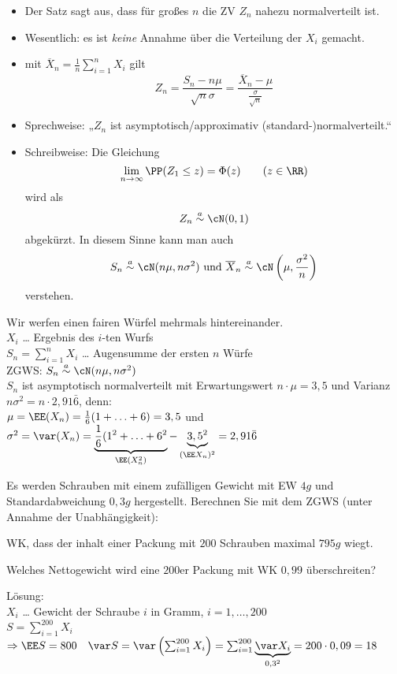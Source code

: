 \begin{itemize}
\item Der Satz sagt aus, dass für großes $n$ die ZV $Z_n$ nahezu normalverteilt ist.
\item Wesentlich: es ist \emph{keine} Annahme über die Verteilung der $X_i$ gemacht.
\item mit $\overline{X}_n = \frac{1}{n}\sum_{i=1}^n X_i$ gilt
$$Z_n=\frac{S_n - n \mu}{\sqrt{n}\sigma} = \frac{\overline{X}_n - \mu}{\frac{\sigma}{\sqrt{n}}}$$
\item Sprechweise: „$Z_n$ ist asymptotisch/approximativ (standard-)normalverteilt.“
\item Schreibweise: Die Gleichung
$$\lim_{n\to \infty} \PP(Z_1 \leq z) = \Phi (z) \qquad (z \in \RR)$$
wird als 
$$Z_n \overset{a}{\sim}\cN (0,1)$$
abgekürzt. In diesem Sinne kann man auch 
$$S_n \overset{a}{\sim} \cN(n \mu, n \sigma^2) \text{ und } \overline{X}_n\overset{a}{\sim}\cN\left(\mu, \frac{\sigma^2}{n}\right)$$
verstehen.
\end{itemize}

 Wir werfen einen fairen Würfel mehrmals hintereinander.\\
$X_i$ … Ergebnis des $i$-ten Wurfs\\
$S_n = \sum_{i=1}^n X_i$ … Augensumme der ersten $n$ Würfe\\
ZGWS: $S_n \overset{a}{\sim} \cN (n \mu, n\sigma^2)$\\
$S_n$ ist asymptotisch normalverteilt mit Erwartungswert $n \cdot \mu =3,5$ und Varianz $n\sigma^2 = n \cdot 2,91\bar 6$, denn: \\
$\mu = \EE(X_n) = \frac{1}{6}(1+\ldots+6)=3,5$ und \\
$\sigma^2=\var(X_n)=\underbrace{\frac{1}{6}(1^2+\ldots + 6^2}_{\EE(X_n^2)}-\underbrace{3,5^2}_{(\EE X_n)^2}=2,91\bar 6$

 Es werden Schrauben mit einem zufälligen Gewicht mit EW $4\unit{g}$ und Standardabweichung $0,3\unit{g}$ hergestellt. Berechnen Sie mit dem ZGWS (unter Annahme der Unabhängigkeit):
\begin{anumerate}
\item WK, dass der inhalt einer Packung mit $200$ Schrauben maximal $795\unit{g}$ wiegt.\label{itm:1.4-10-a}
\item Welches Nettogewicht wird eine $200$er Packung mit WK $0,99$ überschreiten?\label{itm:1.4-10-b}
\end{anumerate}
Lösung:\\
$X_i$ … Gewicht der Schraube $i$ in Gramm, $i=1,\ldots, 200$\\
$S=\sum_{i=1}^{200} X_i$\\
$\Rightarrow \EE S = 800 \quad \var S = \var \left( \sum_{i=1}^{200} X_i\right)=\sum_{i=1}^{200} \underbrace{\var X_i}_{0,3^2} = 200 \cdot 0,09 = 18$


